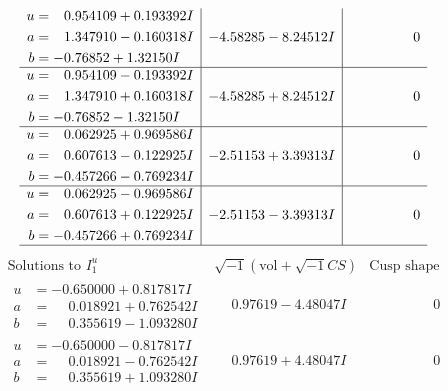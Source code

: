 \documentclass[1p]{elsarticle_modified}
\theoremstyle{definition}
\newcommand{\I}{\sqrt{-1}}
\begin{document}
$$\begin{array}{c|c|c}
\begin{aligned}
u &= \phantom{-}0.954109 + 0.193392 I \\
a &= \phantom{-}1.347910 - 0.160318 I \\
b &= -0.76852 + 1.32150 I\end{aligned}
 & -4.58285 - 8.24512 I & \phantom{-0.000000 } 0 \\ \hline\begin{aligned}
u &= \phantom{-}0.954109 - 0.193392 I \\
a &= \phantom{-}1.347910 + 0.160318 I \\
b &= -0.76852 - 1.32150 I\end{aligned}
 & -4.58285 + 8.24512 I & \phantom{-0.000000 } 0 \\ \hline\begin{aligned}
u &= \phantom{-}0.062925 + 0.969586 I \\
a &= \phantom{-}0.607613 - 0.122925 I \\
b &= -0.457266 - 0.769234 I\end{aligned}
 & -2.51153 + 3.39313 I & \phantom{-0.000000 } 0 \\ \hline\begin{aligned}
u &= \phantom{-}0.062925 - 0.969586 I \\
a &= \phantom{-}0.607613 + 0.122925 I \\
b &= -0.457266 + 0.769234 I\end{aligned}
 & -2.51153 - 3.39313 I & \phantom{-0.000000 } 0\\
 \hline 
 \end{array}$$\newpage$$\begin{array}{c|c|c}  
\text{Solutions to }I^u_{1}& \I (\text{vol} + \sqrt{-1}CS) & \text{Cusp shape}\\
 \hline 
\begin{aligned}
u &= -0.650000 + 0.817817 I \\
a &= \phantom{-}0.018921 + 0.762542 I \\
b &= \phantom{-}0.355619 - 1.093280 I\end{aligned}
 & \phantom{-}0.97619 - 4.48047 I & \phantom{-0.000000 } 0 \\ \hline\begin{aligned}
u &= -0.650000 - 0.817817 I \\
a &= \phantom{-}0.018921 - 0.762542 I \\
b &= \phantom{-}0.355619 + 1.093280 I\end{aligned}
 & \phantom{-}0.97619 + 4.48047 I & \phantom{-0.000000 } 0 \\ \hline\begin{aligned}

\end{aligned}
\end{array}$$
\end{document}
